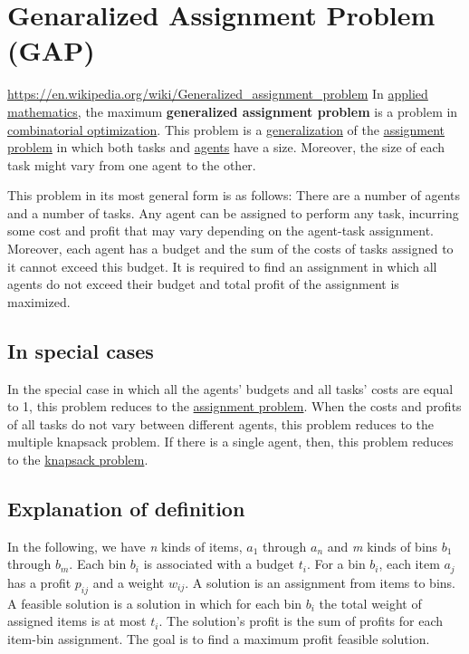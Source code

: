 \section{Genaralized Assignment Problem (GAP)}
\url{https://en.wikipedia.org/wiki/Generalized_assignment_problem}
In \href{applied_mathematics}{applied mathematics}, the maximum
\textbf{generalized assignment problem} is a problem in
\href{combinatorial_optimization}{combinatorial optimization}. This
problem is a \url{generalization} of the
\href{assignment_problem}{assignment problem} in which both tasks and
\href{Agent-based_model}{agents} have a size. Moreover, the size of each
task might vary from one agent to the other.

This problem in its most general form is as follows: There are a number
of agents and a number of tasks. Any agent can be assigned to perform
any task, incurring some cost and profit that may vary depending on the
agent-task assignment. Moreover, each agent has a budget and the sum of
the costs of tasks assigned to it cannot exceed this budget. It is
required to find an assignment in which all agents do not exceed their
budget and total profit of the assignment is maximized.

\hypertarget{in-special-cases}{%
\subsection{In special cases}\label{in-special-cases}}

In the special case in which all the agents' budgets and all tasks'
costs are equal to 1, this problem reduces to the
\href{assignment_problem}{assignment problem}. When the costs and
profits of all tasks do not vary between different agents, this problem
reduces to the multiple knapsack problem. If there is a single agent,
then, this problem reduces to the \href{knapsack_problem}{knapsack
problem}.

\hypertarget{explanation-of-definition}{%
\subsection{Explanation of definition}\label{explanation-of-definition}}

In the following, we have \emph{n} kinds of items, \(a_1\) through
\(a_n\) and \emph{m} kinds of bins \(b_1\) through \(b_m\). Each bin
\(b_i\) is associated with a budget \(t_i\). For a bin \(b_i\), each
item \(a_j\) has a profit \(p_{ij}\) and a weight \(w_{ij}\). A solution
is an assignment from items to bins. A feasible solution is a solution
in which for each bin \(b_i\) the total weight of assigned items is at
most \(t_i\). The solution's profit is the sum of profits for each
item-bin assignment. The goal is to find a maximum profit feasible
solution.

